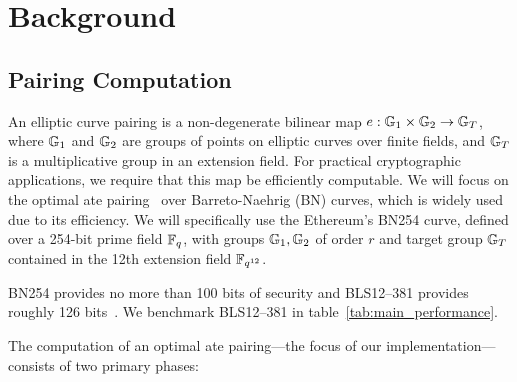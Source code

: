 \section{Background}

\begin{algorithm}
\caption{Optimal Ate pairing over Barreto-Naehrig curves~\cite{PAIRING:BGMORT10}}
\begin{algorithmic}[1]
    \EndIf
    \EndIf
\EndFor
{}
\end{algorithmic}
\end{algorithm}

\subsection{Pairing Computation}

An elliptic curve pairing is a non-degenerate bilinear map $e: \mathbb{G}_1 \times \mathbb{G}_2 \rightarrow \mathbb{G}_T$, where $\mathbb{G}_1$ and $\mathbb{G}_2$ are groups of points on elliptic curves over finite fields, and $\mathbb{G}_T$ is a multiplicative group in an extension field. For practical cryptographic applications, we require that this map be efficiently computable. We will focus on the optimal ate pairing~\cite{PAIRING:BGMORT10} over Barreto-Naehrig (BN) curves, which is widely used due to its efficiency.
We will specifically use the Ethereum's BN254 curve, defined over a 254-bit prime field $\mathbb{F}_q$, with groups $\mathbb{G}_1, \mathbb{G}_2$ of order $r$ and target group $\mathbb{G}_T$ contained in the 12th extension field $\mathbb{F}_{q^{12}}$.

BN254 provides no more than 100 bits of security and BLS12--381 provides roughly 126 bits~\cite{JC:BarDuq19,pfc}. We benchmark BLS12--381 in table~\ref{tab:main_performance}.

The computation of an optimal ate pairing---the focus of our implementation---consists of two primary phases:

